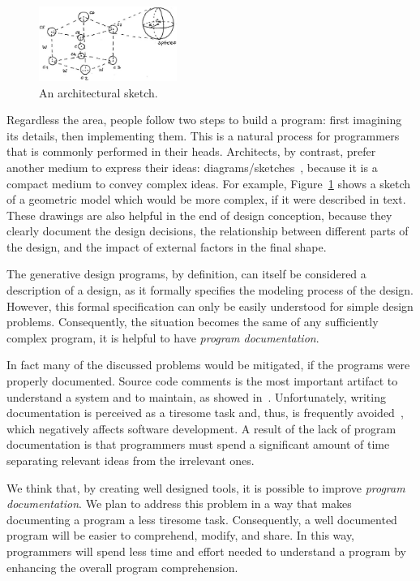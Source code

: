 \begin{figure}
  \vspace{-20pt}
  \begin{center}
    \includegraphics[width=0.4\textwidth]{img/cube-sketch}
  \end{center}
  \vspace{-15pt}
 \caption{An architectural sketch.}  
  \vspace{-20pt}
    \label{fig:sketch}
\end{figure}

Regardless the area, people follow two steps to build a program: first imagining its details, then implementing them. This is a natural process for programmers that is commonly performed in their heads. Architects, by contrast, prefer another medium to express their ideas: diagrams/sketches~\cite{do2001thinking}, because it is a compact medium to convey complex ideas. For example, Figure~\ref{fig:sketch} shows a sketch of a geometric model which would be more complex, if it were described in text. These drawings are also helpful in the end of design conception, because they clearly document the design decisions, the relationship between different parts of the design, and the impact of external factors in the final shape.

The generative design programs, by definition, can itself be considered a description of a design, as it formally specifies the modeling process of the design. However, this formal specification can only be easily understood for simple design problems. Consequently, the situation becomes the same of any sufficiently complex program, it is helpful to have \textit{program documentation}.

In fact many of the discussed problems would be mitigated, if the programs were properly documented. Source code comments is the most important artifact to understand a system and to maintain, as showed in~\cite{de2005study}. Unfortunately, writing documentation is perceived as a tiresome task and, thus, is frequently avoided~\cite{sousa1998survey}, which negatively affects software development. A result of the lack of program documentation is that programmers must spend a significant amount of time separating relevant ideas from the irrelevant ones.

We think that, by creating well designed tools, it is possible to improve \textit{program documentation}. We plan to address this problem in a way that makes documenting a program a less tiresome task. Consequently, a well documented program will be easier to comprehend, modify, and share. In this way, programmers will spend less time and effort needed to understand a program by enhancing the overall program comprehension.